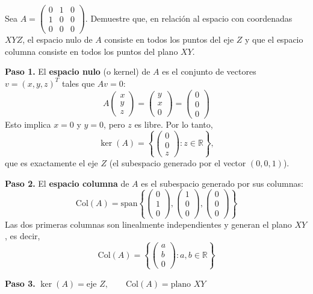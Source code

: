 \begin{prob}
Sea $A = \begin{pmatrix}
0 & 1 & 0 \\
1 & 0 & 0 \\
0 & 0 & 0
\end{pmatrix}$. Demuestre que, en relación al espacio con coordenadas $XYZ$, el espacio nulo de $A$ consiste en todos los puntos del eje $Z$ y que el espacio columna consiste en todos los puntos del plano $XY$.
\begin{myproof}
\textbf{Paso 1.} El \textbf{espacio nulo} (o kernel) de $A$ es el conjunto de vectores $v = (x, y, z)^T$ tales que $A v = 0$:
\[
A \begin{pmatrix} x \\ y \\ z \end{pmatrix} = \begin{pmatrix} y \\ x \\ 0 \end{pmatrix} = \begin{pmatrix} 0 \\ 0 \\ 0 \end{pmatrix}
\]
Esto implica $x = 0$ y $y = 0$, pero $z$ es libre. Por lo tanto,
\[
\ker(A) = \left\{ \begin{pmatrix} 0 \\ 0 \\ z \end{pmatrix} : z \in \mathbb{R} \right\},
\]
que es exactamente el eje $Z$ (el subespacio generado por el vector $(0,0,1)$).

\textbf{Paso 2.} El \textbf{espacio columna} de $A$ es el subespacio generado por sus columnas:
\[
\text{Col}(A) = \text{span}\left\{ \begin{pmatrix} 0 \\ 1 \\ 0 \end{pmatrix}, \begin{pmatrix} 1 \\ 0 \\ 0 \end{pmatrix}, \begin{pmatrix} 0 \\ 0 \\ 0 \end{pmatrix} \right\}
\]
Las dos primeras columnas son linealmente independientes y generan el plano $XY$, es decir,
\[
\text{Col}(A) = \left\{ \begin{pmatrix} a \\ b \\ 0 \end{pmatrix} : a, b \in \mathbb{R} \right\}
\]

\textbf{Paso 3.} $\boxed{\ker(A) = \text{eje } Z, \qquad \text{Col}(A) = \text{plano } XY}$
\end{myproof}
\end{prob}

